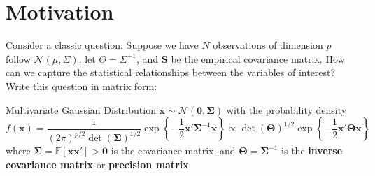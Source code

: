 \documentclass[twoside]{article}
\begin{document}

\section{Motivation}
Consider a classic question: Suppose we have $N$ observations of dimension $p$ follow $\mathcal{N}(\mu,\Sigma)$. let $\Theta = \Sigma^{-1}$, and $\mathbf{S}$ be the empirical covariance matrix. How can we capture the statistical relationships between the variables of interest? Write this question in matrix form:
\begin{example}{Multivariate Gaussian Distribution}{}
     $\mathbf{x}\sim \mathcal{N}(\mathbf{0},\boldsymbol{\Sigma})$ with the probability density 
    $$
    f(\mathbf{x}) = \frac{1}{(2\pi)^{p/2}\det (\boldsymbol{\Sigma})^{1/2}}\exp\left\{ -\frac{1}{2}\mathbf{x}'\boldsymbol{\Sigma}^{-1}\mathbf{x} \right\} \propto \det (\boldsymbol{\Theta})^{1/2}\exp\left\{ -\frac{1}{2} \mathbf{x}'\boldsymbol{\Theta}\mathbf{x} \right\}
    $$
    where $\boldsymbol{\Sigma}=\mathbb{E}[\mathbf{xx}'] > \mathbf{0}$ is the covariance matrix, and $ \boldsymbol{\Theta}=\boldsymbol{\Sigma}^{-1} $ is the \textbf{inverse covariance matrix} or \textbf{precision matrix}
\end{example}

%
%
\end{document}
